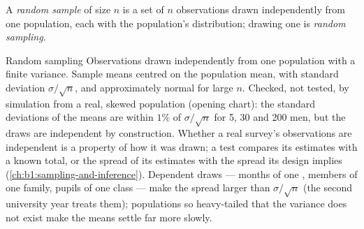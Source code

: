 
\label{lst:b1:random-variables-for-econometrics:clt}

\label{out:b1:random-variables-for-econometrics:clt}

\begin{definition}\label{def:b1:random-variables-for-econometrics:random-sample}
A \emph{random sample} of size $n$ is a set of $n$ observations drawn
independently from one population, each with the population's
distribution; drawing one is \emph{random sampling}.
\end{definition}

\begin{model}{Random sampling}
\assumes Observations drawn independently from one population with a
finite variance.
\predicts Sample means centred on the population mean, with standard
deviation $\sigma/\sqrt n$, and approximately normal for large $n$.
\tested Checked, not tested, by simulation from a real, skewed
population (opening chart): the standard deviations of the means are
within $1\%$ of $\sigma/\sqrt n$ for 5, 30 and 200 men, %
but the draws are independent by construction. Whether a real survey's
observations are independent is a property of how it was drawn; a test
compares its estimates with a known total, or the spread of its estimates
with the spread its design implies (\cref{ch:b1:sampling-and-inference}).
\breaks Dependent draws --- months of one , members of one
family, pupils of one class --- make the spread larger than $\sigma/\sqrt n$ (the
second university year treats them); populations so heavy-tailed that the
variance does not exist make the means settle far more slowly.
\end{model}

\label{lst:b1:random-variables-for-econometrics:heavy}


